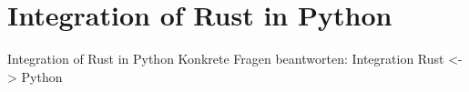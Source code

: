 
\section{Integration of Rust in Python}


\begin{frame}[c]{Integration of Rust in Python}
    Konkrete Fragen beantworten: Integration Rust <-> Python
\end{frame}



